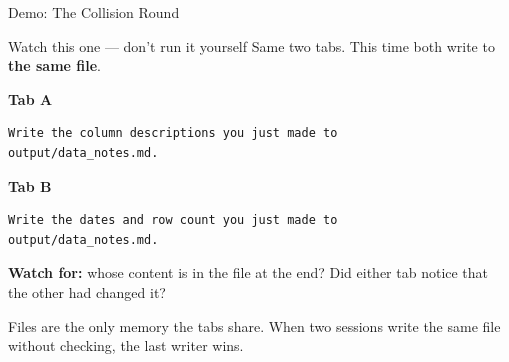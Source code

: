 \documentclass[aspectratio=169, 11pt]{beamer}
\begin{document}
\begin{frame}[fragile]{Demo: The Collision Round}
  \begin{alertblock}{Watch this one --- don't run it yourself}
    Same two tabs. This time both write to \textbf{the same file}.
  \end{alertblock}

  \vspace{0.4em}
  \textbf{Tab A}
  \begin{lstlisting}[basicstyle=\ttfamily\footnotesize]
Write the column descriptions you just made to
output/data_notes.md.
  \end{lstlisting}

  \textbf{Tab B}
  \begin{lstlisting}[basicstyle=\ttfamily\footnotesize]
Write the dates and row count you just made to
output/data_notes.md.
  \end{lstlisting}

  \vspace{0.3em}
  \textbf{Watch for:} whose content is in the file at the end? Did either tab notice that the other had changed it?

  \vspace{0.4em}
  \alert{Files are the only memory the tabs share. When two sessions write the same file without checking, the last writer wins.}
\end{frame}
\end{document}
